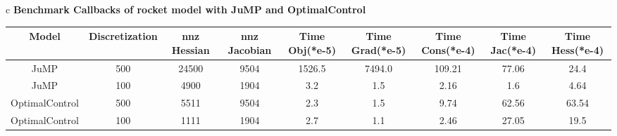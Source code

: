 \documentclass{standalone}
\begin{document}
\begin{tabular}{c}
\Large\textbf{Benchmark Callbacks of rocket model with JuMP and OptimalControl}\\
\begin{tabular}{ccccccccc}
  \hline
  \textbf{Model} & \textbf{Discretization} & \textbf{nnz Hessian} & \textbf{nnz Jacobian} & \textbf{Time Obj(*e-5)} & \textbf{Time Grad(*e-5)} & \textbf{Time Cons(*e-4)} & \textbf{Time Jac(*e-4)} & \textbf{Time Hess(*e-4)} \\\hline
  JuMP & 500 & 24500 & 9504 & 1526.5 & 7494.0 & 109.21 & 77.06 & 24.4 \\
  JuMP & 100 & 4900 & 1904 & 3.2 & 1.5 & 2.16 & 1.6 & 4.64 \\
  OptimalControl & 500 & 5511 & 9504 & 2.3 & 1.5 & 9.74 & 62.56 & 63.54 \\
  OptimalControl & 100 & 1111 & 1904 & 2.7 & 1.1 & 2.46 & 27.05 & 19.5 \\\hline
\end{tabular}
\end{tabular}
\end{document}
